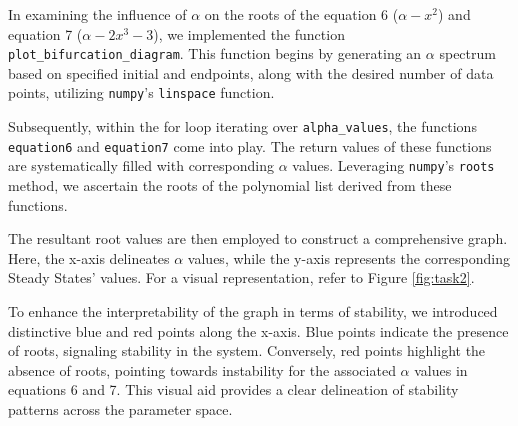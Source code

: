 In examining the influence of $\alpha$ on the roots of the equation 6 ($\alpha - x^2$) and equation 7 ($\alpha - 2x^3 - 3$), we implemented the function \texttt{plot\_bifurcation\_diagram}. This function begins by generating an $\alpha$ spectrum based on specified initial and endpoints, along with the desired number of data points, utilizing \texttt{numpy}'s \texttt{linspace} function.

Subsequently, within the for loop iterating over \texttt{alpha\_values}, the functions \texttt{equation6} and \texttt{equation7} come into play. The return values of these functions are systematically filled with corresponding $\alpha$ values. Leveraging \texttt{numpy}'s \texttt{roots} method, we ascertain the roots of the polynomial list derived from these functions.

The resultant root values are then employed to construct a comprehensive graph. Here, the x-axis delineates $\alpha$ values, while the y-axis represents the corresponding Steady States' values. For a visual representation, refer to Figure \ref{fig:task2}.

To enhance the interpretability of the graph in terms of stability, we introduced distinctive blue and red points along the x-axis. Blue points indicate the presence of roots, signaling stability in the system. Conversely, red points highlight the absence of roots, pointing towards instability for the associated $\alpha$ values in equations 6 and 7. This visual aid provides a clear delineation of stability patterns across the parameter space.


